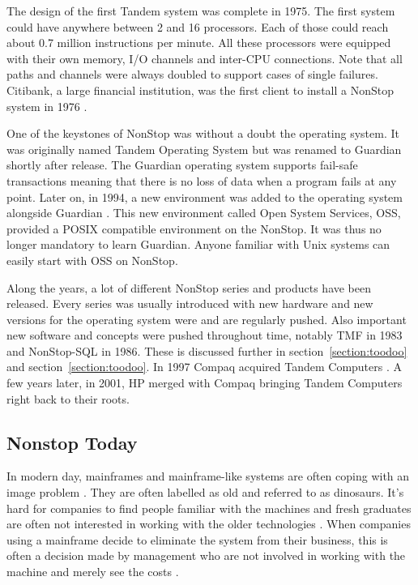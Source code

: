 The design of the first Tandem system was complete in 1975. The first system could have
anywhere between 2 and 16 processors. Each of those could reach about 0.7 million instructions per minute.
All these processors were equipped with their own memory, I/O channels and inter-CPU connections. Note that 
all paths and channels were always doubled to support cases of single failures. 
Citibank, a large financial institution, was the first client to install a NonStop system in 1976 \autocite{nonstophistory}.

One of the keystones of NonStop was without a doubt the operating system. It was originally named Tandem Operating System 
but was renamed to Guardian shortly after release. The Guardian operating system supports fail-safe transactions meaning that there
is no loss of data when a program fails at any point. Later on, in 1994, a new environment was added to the operating system alongside Guardian \autocite{nonstophistory}.
This new environment called Open System Services, OSS, provided a POSIX compatible environment on the NonStop. 
It was thus no longer mandatory to learn Guardian. Anyone familiar with Unix systems can easily start with 
OSS on NonStop.

Along the years, a lot of different NonStop series and products have been released. Every series was usually 
introduced with new hardware and new versions for the operating system were and are regularly pushed. Also important new software and concepts
were pushed throughout time,
notably TMF in 1983 and NonStop-SQL in 1986. These is discussed further in section~\ref{section:toodoo} and section~\ref{section:toodoo}.
In 1997 Compaq acquired Tandem
Computers \autocite{compaqtandem}. A few years later, in 2001, HP merged with Compaq \autocite{hpcompaq} bringing Tandem Computers right back to their roots.

\subsection{Nonstop Today}

In modern day, mainframes and mainframe-like systems are often coping with an image problem \autocite{imageproblem}.
They are often labelled as old and referred to as dinosaurs. It's hard for companies to find people familiar
with the machines and fresh graduates are often not interested in working with the older technologies \autocite{recruit}.
When companies using a mainframe decide to eliminate the system from their business, this is often a decision made by management who are not
involved in working with the machine and merely see the costs \autocite{imageproblem}.


